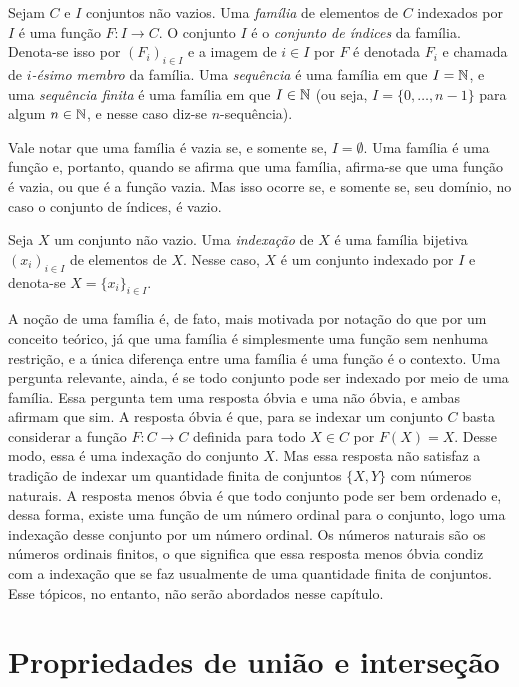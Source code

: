 \begin{definition}
Sejam $C$ e $I$ conjuntos não vazios. Uma \emph{família} de elementos de $C$ indexados por $I$ é uma função $F: I \to C$. O conjunto $I$ é o \emph{conjunto de índices} da família. Denota-se isso por $(F_i)_{i \in I}$ e a imagem de $i \in I$ por $F$ é denotada $F_i$ e chamada de \emph{$i$-ésimo membro} da família.
\noindent
Uma \emph{sequência} é uma família em que $I=\mathbb{N}$, e uma \emph{sequência finita} é uma família em que $I \in \mathbb{N}$ (ou seja, $I=\{0,\ldots,n-1\}$ para algum $n \in \mathbb{N}$, e nesse caso diz-se $n$-sequência).
\end{definition}

Vale notar que uma família é vazia se, e somente se, $I=\emptyset$. Uma família é uma função e, portanto, quando se afirma que uma família, afirma-se que uma função é vazia, ou que é a função vazia. Mas isso ocorre se, e somente se, seu domínio, no caso o conjunto de índices, é vazio.

\begin{definition}
	Seja $X$ um conjunto não vazio. Uma \emph{indexação} de $X$ é uma família bijetiva $(x_i)_{i \in I}$ de elementos de $X$. Nesse caso, $X$ é um conjunto indexado por $I$ e denota-se $X=\{x_i\}_{i \in I}$.
\end{definition}

A noção de uma família é, de fato, mais motivada por notação do que por um conceito teórico, já que uma família é simplesmente uma função sem nenhuma restrição, e a única diferença entre uma família é uma função é o contexto. Uma pergunta relevante, ainda, é se todo conjunto pode ser indexado por meio de uma família. Essa pergunta tem uma resposta óbvia e uma não óbvia, e ambas afirmam que sim. A resposta óbvia é que, para se indexar um conjunto $C$ basta considerar a função $F: C \to C$ definida para todo $X \in C$ por $F(X)=X$. Desse modo, essa é uma indexação do conjunto $X$. Mas essa resposta não satisfaz a tradição de indexar um quantidade finita de conjuntos $\{X,Y\}$ com números naturais. A resposta menos óbvia é que todo conjunto pode ser bem ordenado e, dessa forma, existe uma função de um número ordinal para o conjunto, logo uma indexação desse conjunto por um número ordinal. Os números naturais são os números ordinais finitos, o que significa que essa resposta menos óbvia condiz com a indexação que se faz usualmente de uma quantidade finita de conjuntos. Esse tópicos, no entanto, não serão abordados nesse capítulo.

\section{Propriedades de união e interseção}

